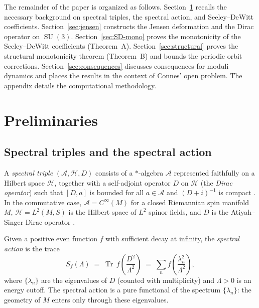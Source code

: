 \documentclass[12pt]{article}
\theoremstyle{definition}
\theoremstyle{remark}
\DeclareMathOperator{\Tr}{Tr}
\DeclareMathOperator{\SU}{SU}
\begin{document}
The remainder of the paper is organized as follows.
Section~\ref{sec:prelim} recalls the necessary background on spectral
triples, the spectral action, and Seeley--DeWitt coefficients.
Section~\ref{sec:jensen} constructs the Jensen deformation and the
Dirac operator on $\SU(3)$.  Section~\ref{sec:SD-mono} proves the
monotonicity of the Seeley--DeWitt coefficients (Theorem~A).
Section~\ref{sec:structural} proves the structural monotonicity
theorem (Theorem~B) and bounds the periodic orbit corrections.
Section~\ref{sec:consequences} discusses consequences for moduli
dynamics and places the results in the context of Connes' open
problem.  The appendix details the computational methodology.


\section{Preliminaries}\label{sec:prelim}

\subsection{Spectral triples and the spectral action}

A \emph{spectral triple} $(\mathcal{A}, \mathcal{H}, D)$ consists of a
$*$-algebra $\mathcal{A}$ represented faithfully on a Hilbert space
$\mathcal{H}$, together with a self-adjoint operator $D$ on
$\mathcal{H}$ (the \emph{Dirac operator}) such that
$[D, a]$ is bounded for all $a \in \mathcal{A}$ and $(D + i)^{-1}$ is
compact \cite{Connes1994}.  In the commutative case,
$\mathcal{A} = C^\infty(M)$ for a closed Riemannian spin manifold $M$,
$\mathcal{H} = L^2(M, S)$ is the Hilbert space of $L^2$ spinor
fields, and $D$ is the Atiyah--Singer Dirac operator
\cite{LawsonMichelsohn1989}.

Given a positive even function $f$ with sufficient decay at infinity,
the \emph{spectral action} is the trace
\begin{equation}\label{eq:spectral-action}
  S_f(\Lambda) \;=\; \Tr\, f\!\left(\frac{D^2}{\Lambda^2}\right)
  \;=\; \sum_n f\!\left(\frac{\lambda_n^2}{\Lambda^2}\right),
\end{equation}
where $\{\lambda_n\}$ are the eigenvalues of $D$ (counted with
multiplicity) and $\Lambda > 0$ is an energy cutoff.  The spectral
action is a pure functional of the spectrum $\{\lambda_n\}$: the
geometry of $M$ enters only through these eigenvalues.
\end{document}
